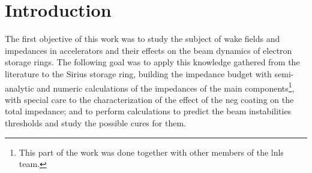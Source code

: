 
% 






	\frenchspacing

	\pretextual
	

	\textual

\chapter{Introduction} \label{chap:intro}

    The first objective of this work was to study the subject of wake fields and impedances in accelerators and their effects on the beam dynamics of electron storage rings. The following goal was to apply this knowledge gathered from the literature to the Sirius storage ring, building the impedance budget with semi-analytic and numeric calculations of the impedances of the main components\footnote{This part of the work was done together with other members of the \gls{lnls} team.}, with special care to the characterization of the effect of the \gls{neg} coating on the total impedance; and to perform calculations to predict the beam instabilities thresholds and study the possible cures for them.

